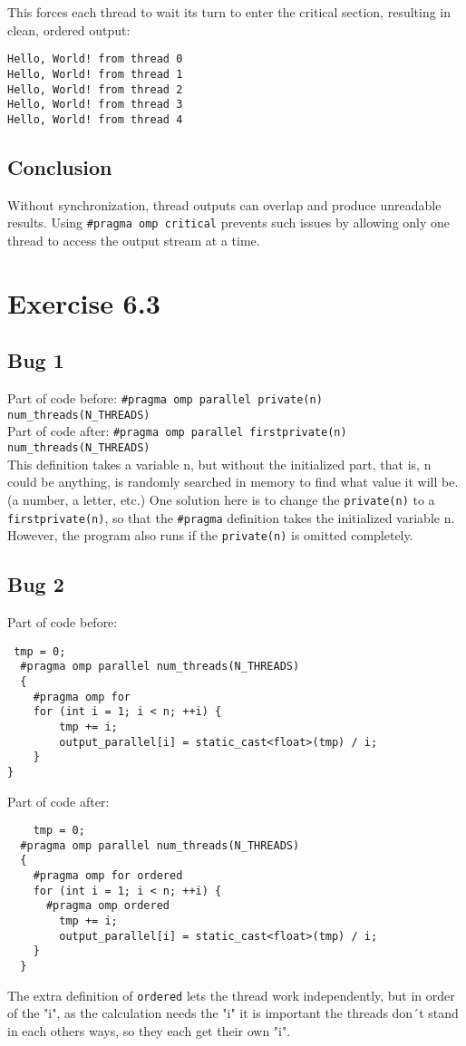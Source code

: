 \documentclass[a4paper]{article}
\begin{document}
This forces each thread to wait its turn to enter the critical section, resulting in clean, ordered output:\\

\begin{verbatim}
Hello, World! from thread 0
Hello, World! from thread 1
Hello, World! from thread 2
Hello, World! from thread 3
Hello, World! from thread 4
\end{verbatim}

\subsection*{Conclusion}

Without synchronization, thread outputs can overlap and produce unreadable results. Using \texttt{\#pragma omp critical} prevents such issues by allowing only one thread to access the output stream at a time.
\section*{Exercise 6.3}
\subsection*{Bug 1}
Part of code before: 
\lstinline{#pragma omp parallel private(n) num_threads(N_THREADS)} \\
Part of code after:
\lstinline{#pragma omp parallel firstprivate(n) num_threads(N_THREADS)} \\

This definition takes a variable n, but without the initialized part, that is, n could be anything, is randomly searched in memory to find what value it will be. (a number, a letter, etc.)
One solution here is to change the \lstinline{private(n)} to a \lstinline{firstprivate(n)}, so that the \lstinline{#pragma} definition takes the initialized variable n. However, the program also runs if the \lstinline{private(n)} is omitted completely.

\subsection*{Bug 2}
Part of code before: 
\begin{lstlisting}
 tmp = 0;
  #pragma omp parallel num_threads(N_THREADS)
  {
    #pragma omp for
    for (int i = 1; i < n; ++i) {
        tmp += i;
        output_parallel[i] = static_cast<float>(tmp) / i;
    }
}
\end{lstlisting}
Part of code after:
\begin{lstlisting}
    tmp = 0;
  #pragma omp parallel num_threads(N_THREADS)
  {
    #pragma omp for ordered
    for (int i = 1; i < n; ++i) {
      #pragma omp ordered
        tmp += i;
        output_parallel[i] = static_cast<float>(tmp) / i;
    }
  }
\end{lstlisting}
The extra definition of \lstinline{ordered} lets the thread work independently, but in order of the "i", as the calculation needs the "i" it is important the threads don´t stand in each others ways, so they each get their own "i".
\end{document}

